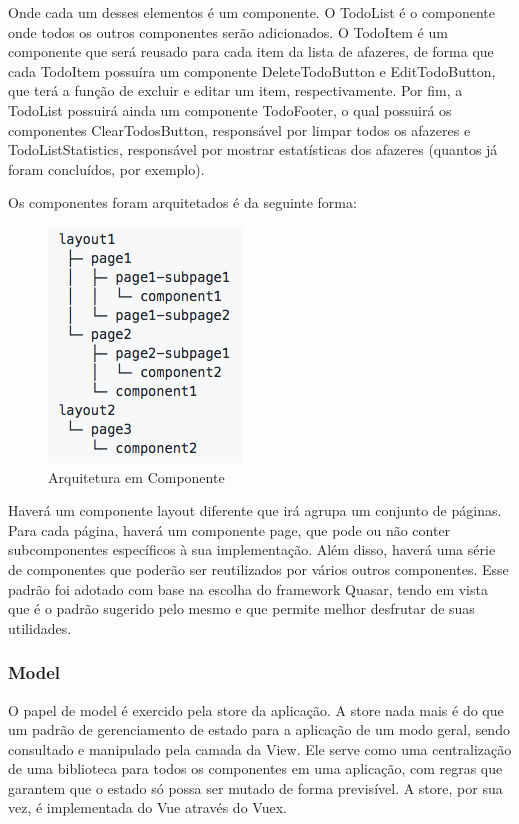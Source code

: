 \begin{apendicesenv}
Onde cada um desses elementos é um componente. O TodoList é o componente onde todos os outros componentes serão adicionados. O TodoItem é um componente que será reusado para cada item da lista de afazeres, de forma que cada TodoItem possuíra um componente DeleteTodoButton e EditTodoButton, que terá a função de excluir e editar um item, respectivamente. Por fim, a TodoList possuirá ainda um componente TodoFooter, o qual possuirá os componentes ClearTodosButton, responsável por limpar todos os afazeres e TodoListStatistics, responsável por mostrar estatísticas dos afazeres (quantos já foram concluídos, por exemplo).

Os componentes foram arquitetados é da seguinte forma:

\begin{figure}[!ht]
	\centering
		\includegraphics[scale=0.6]{figuras/software/6-arquitetura-componentes-projeto.png}
	\caption{Arquitetura em Componente}
\end{figure}

Haverá um componente layout diferente que irá agrupa um conjunto de páginas. Para cada página, haverá um componente page, que pode ou não conter subcomponentes específicos à sua implementação. Além disso, haverá uma série de componentes que poderão ser reutilizados por vários outros componentes. Esse padrão foi adotado com base na escolha do framework Quasar, tendo em vista que é o padrão sugerido pelo mesmo e que permite melhor
desfrutar de suas utilidades.\cite{arquiteturaCompView} \cite{estruturaQuasar}
 
\subsubsection{Model}
O papel de model é exercido pela store da aplicação. A store nada mais é do que um padrão de gerenciamento de estado para a aplicação de um modo geral, sendo consultado e manipulado pela camada da View. Ele serve como uma centralização de uma biblioteca para todos os componentes em uma aplicação, com regras que garantem que o estado só possa ser mutado de forma previsível. A store, por sua vez, é implementada do Vue através do Vuex.


\end{apendicesenv}
